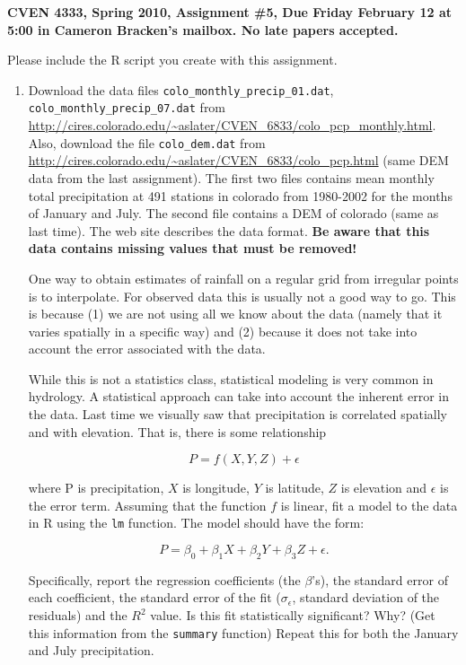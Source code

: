 \documentclass[11pt]{article}
\begin{document}
\textbf{CVEN 4333, Spring 2010, Assignment \#5, Due Friday February 12 at 5:00 in Cameron Bracken's mailbox. No late papers accepted.}

Please include the \textsf{R} script you create with this assignment.

\begin{enumerate}

\item Download the data files \texttt{colo\_monthly\_precip\_01.dat}, \texttt{colo\_monthly\_precip\_07.dat} from \url{http://cires.colorado.edu/~aslater/CVEN_6833/colo_pcp_monthly.html}. Also, download the file \texttt{colo\_dem.dat} from \url{http://cires.colorado.edu/~aslater/CVEN\_6833/colo_pcp.html} (same DEM data from the last assignment).  The first two files contains mean monthly total precipitation at 491 stations in colorado from 1980-2002 for the months of January and July.  The second file contains a DEM of colorado (same as last time). The web site describes the data format.  \textbf{Be aware that this data contains missing values that must be removed!}

One way to obtain estimates of rainfall on a regular grid from irregular points is to interpolate.   For observed data this is usually not a good way to go.  This is because (1) we are not using all we know about the data (namely that it varies spatially in a specific way) and (2) because it does not take into account the error associated with the data. 

While this is not a statistics class, statistical modeling is very common in hydrology.  A statistical approach can take into account the inherent error in the data.  Last time we visually saw that precipitation is correlated spatially and with elevation.  That is, there is some relationship

$$P = f(X,Y,Z) + \epsilon$$

where P is precipitation, $X$ is longitude, $Y$ is latitude, $Z$ is elevation and $\epsilon$ is the  error term.  Assuming that the function $f$ is linear, fit a model to the data in \textsf{R} using the \texttt{lm} function.  The model should have the form:

$$P = \beta_0 + \beta_1X+\beta_2Y+\beta_3Z + \epsilon.$$

Specifically, report the regression coefficients (the $\beta$'s), the standard error of each coefficient, the standard error of the fit ($\sigma_\epsilon$, standard deviation of the residuals) and the $R^2$ value. Is this fit statistically significant? Why? (Get this information from the \texttt{summary} function) Repeat this for both the January and July precipitation. 


\end{enumerate}
\end{document}
